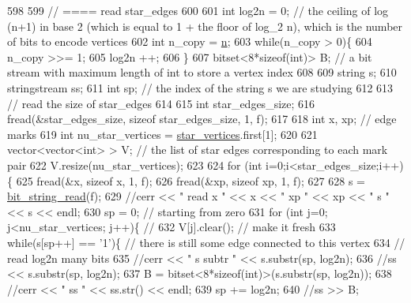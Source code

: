 \begin{DoxyCode}
598 
599   \textcolor{comment}{// ==== read star\_edges}
600 
601   \textcolor{keywordtype}{int} log2n = 0; \textcolor{comment}{// the ceiling of log (n+1) in base 2 (which is equal to 1 + the floor of log\_2 n), which
       is the number of bits to encode vertices}
602   \textcolor{keywordtype}{int} n\_copy = \hyperlink{classmarked__graph__compressed_a8d841016ddb11cfd33748c8deb6277ba}{n};
603   \textcolor{keywordflow}{while}(n\_copy > 0)\{
604     n\_copy >>= 1;
605     log2n ++;
606   \}
607   bitset<8*sizeof(int)> B; \textcolor{comment}{// a bit stream with maximum length of int to store a vertex index}
608 
609   \textcolor{keywordtype}{string} s;
610   stringstream ss;
611   \textcolor{keywordtype}{int} sp; \textcolor{comment}{// the index of the string s we are studying }
612 
613   \textcolor{comment}{// read the size of star\_edges}
614 
615   \textcolor{keywordtype}{int} star\_edges\_size;
616   fread(&star\_edges\_size, \textcolor{keyword}{sizeof} star\_edges\_size, 1, f);
617 
618   \textcolor{keywordtype}{int} x, xp; \textcolor{comment}{// edge marks}
619   \textcolor{keywordtype}{int} nu\_star\_vertices = \hyperlink{classmarked__graph__compressed_a7a4ced4586e2e353f9076bd447df5208}{star\_vertices}.first[1];
620 
621   vector<vector<int> > V; \textcolor{comment}{// the list of star edges corresponding to each mark pair}
622   V.resize(nu\_star\_vertices);
623 
624   \textcolor{keywordflow}{for} (\textcolor{keywordtype}{int} i=0;i<star\_edges\_size;i++)\{
625     fread(&x, \textcolor{keyword}{sizeof} x, 1, f);
626     fread(&xp, \textcolor{keyword}{sizeof} xp, 1, f);
627   
628     s = \hyperlink{compression__helper_8cpp_a40e8dcbc036f96b28e003e882c4890b7}{bit\_string\_read}(f);
629     \textcolor{comment}{//cerr << " read  x " << x << " xp " << xp << " s " << s << endl;}
630     sp = 0; \textcolor{comment}{// starting from zero }
631     \textcolor{keywordflow}{for} (\textcolor{keywordtype}{int} j=0; j<nu\_star\_vertices; j++)\{ \textcolor{comment}{// }
632       V[j].clear(); \textcolor{comment}{// make it fresh}
633       \textcolor{keywordflow}{while}(s[sp++] == \textcolor{charliteral}{'1'})\{ \textcolor{comment}{// there is still some edge connected to this vertex }
634         \textcolor{comment}{// read log2n many bits}
635         \textcolor{comment}{//cerr << " s subtr " << s.substr(sp, log2n);}
636         \textcolor{comment}{//ss << s.substr(sp, log2n);}
637         B = bitset<8*sizeof(int)>(s.substr(sp, log2n));
638         \textcolor{comment}{//cerr << " ss " << ss.str() << endl;}
639         sp += log2n;
640         \textcolor{comment}{//ss >> B;}

\end{DoxyCode}
